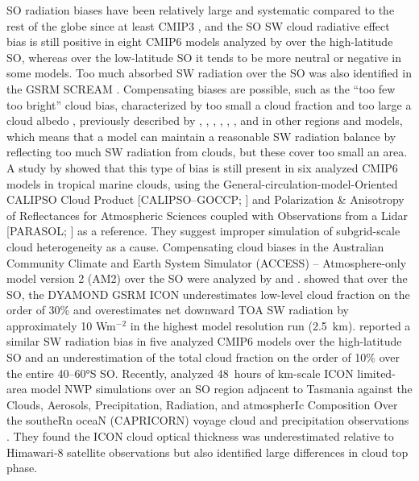 \documentclass[draft]{agujournal2019}
\begin{document}
SO radiation biases have been relatively large and systematic compared to the rest of the globe since at least CMIP3 \cite{trenberth2010,bodas-salcedo2012}, and the SO SW cloud radiative effect bias is still positive in eight CMIP6 models analyzed by  over the high-latitude SO, whereas over the low-latitude SO it tends to be more neutral or negative in some models. Too much absorbed SW radiation over the SO was also identified in the GSRM SCREAM \cite{caldwell2021}. Compensating biases are possible, such as the ``too few too bright'' cloud bias, characterized by too small a cloud fraction and too large a cloud albedo \cite{wall2017,kuma2020}, previously described by , , , , , , and  in other regions and models, which means that a model can maintain a reasonable SW radiation balance by reflecting too much SW radiation from clouds, but these cover too small an area. A study by  showed that this type of bias is still present in six analyzed CMIP6 models in tropical marine clouds, using the General-circulation-model-Oriented CALIPSO Cloud Product [CALIPSO–GOCCP; ] and Polarization \& Anisotropy of Reflectances for Atmospheric Sciences coupled with Observations from a Lidar [PARASOL; ] as a reference. They suggest improper simulation of subgrid-scale cloud heterogeneity as a cause. Compensating cloud biases in the Australian Community Climate and Earth System Simulator (ACCESS) – Atmosphere-only model version 2 (AM2) over the SO were analyzed by  and .  showed that over the SO, the DYAMOND GSRM ICON underestimates low-level cloud fraction on the order of 30\% and overestimates net downward TOA SW radiation by approximately 10 Wm$^\mathrm{-2}$ in the highest model resolution run (2.5~km).  reported a similar SW radiation bias in five analyzed CMIP6 models over the high-latitude SO and an underestimation of the total cloud fraction on the order of 10\% over the entire 40–60°S SO. Recently,  analyzed 48~hours of km-scale ICON limited-area model NWP simulations over an SO region adjacent to Tasmania against the Clouds, Aerosols, Precipitation, Radiation, and atmospherIc Composition Over the southeRn oceaN (CAPRICORN) voyage cloud and precipitation observations \cite{mcfarquhar2021}. They found the ICON cloud optical thickness was underestimated relative to Himawari‐8 satellite observations but also identified large differences in cloud top phase.
\end{document}
